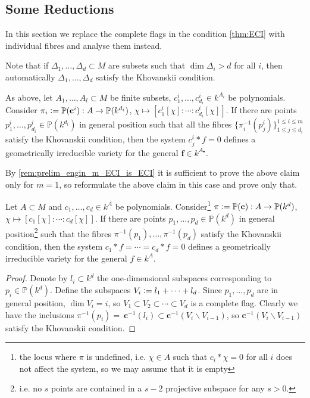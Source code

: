 \subsection{Some Reductions}\label{ssec:ECI_simpler}
In this section we replace the complete flags in the condition \autoref{thm:ECI} with individual fibres and analyse them instead.

\begin{remark}
    Note that if $\Delta_1, \dots, \Delta_d \subset M$ are subsets such that $\dim \Delta_i > d$ for all $i$, then automatically $\Delta_1, \dots, \Delta_d$ satisfy the Khovanskii condition.
\end{remark}

\begin{claim}
    As above, let $A_1, \dots, A_l \subset M$ be finite subsets, $c^i_1, \dots, c^i_{d_i} \in k^{A_i}$ be polynomials. Consider $\pi_i \vcentcolon= \mathbb P(\mathbf c^i): A \to \mathbb P(k^{d_i})$, $\chi \mapsto \left[c^i_1[\chi]: \cdots : c^i_{d_i}[\chi]\right]$. If there are points $p^i_1, \dots, p^i_{d_i} \in \mathbb P(k^{d_i})$ in general position such that all the fibres $\{ \pi_i^{-1} (p^i_j) \}^{1 \le i \le m}_{1 \le j \le d_i}$ satisfy the Khovanskii condition, then the system $c^i_j * f = 0$ defines a geometrically irreducible variety for the general $\mathbf f \in k^{A_\bullet}$.
\end{claim}

By \autoref{rem:prelim_engin_m_ECI_is_ECI} it is sufficient to prove the above claim only for $m = 1$, so reformulate the above claim in this case and prove only that.

\begin{claim}\label{claim:ECI_simpler}
    Let $A \subset M$ and $c_1, \dots, c_d \in k^A$ be polynomials. Consider\footnote{the locus where $\pi$ is undefined, i.e. $\chi \in A$ such that $c_i * \chi = 0$ for all $i$ does not affect the system, so we may assume that it is empty} $\pi \vcentcolon= \mathbb P(\mathbf c): A \to \mathbb P(k^d)$, $\chi \mapsto \left[ c_1[\chi] : \cdots : c_d[\chi] \right]$. If there are points $p_1, \dots, p_d \in \mathbb P(k^d)$ in general position\footnote{i.e. no $s$ points are contained in a $s - 2$ projective subspace for any $s > 0$.} such that the fibres $\pi^{-1}(p_1), \dots, \pi^{-1}(p_d)$ satisfy the Khovanskii condition, then the system $c_1 * f = \cdots = c_d * f = 0$ defines a geometrically irreducible variety for the general $f \in k^A$.
\end{claim}
\begin{proof}
    Denote by $l_i \subset k^d$ the one-dimensional subspaces corresponding to $p_i \in \mathbb P(k^d)$. Define the subspaces $V_i \vcentcolon= l_1 + \cdots + l_d$. Since $p_1, \dots, p_d$ are in general position, $\dim V_i = i$, so $V_1 \subset V_2 \subset \cdots \subset V_d$ is a complete flag. Clearly we have the inclusions $\pi^{-1} (p_i) = ~\mathbf c^{-1} (l_i) \subset \mathbf c^{-1} (V_i \backslash V_{i - 1})$, so $\mathbf c^{-1} (V_i \backslash V_{i - 1})$ satisfy the Khovanskii condition.
\end{proof}


